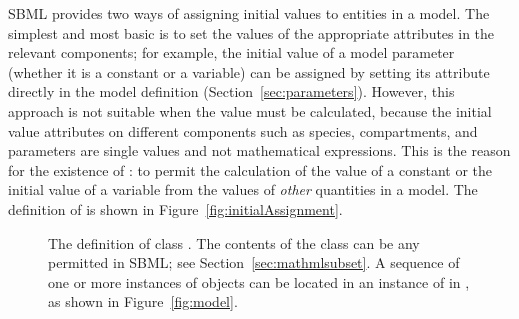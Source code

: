 SBML \thisLV provides two ways of assigning initial values to
entities in a model.  The simplest and most basic is to set the
values of the appropriate attributes in the relevant
components; for example, the initial value of a model parameter
(whether it is a constant or a variable) can be assigned by
setting its  attribute directly in the model definition
(Section~\ref{sec:parameters}).  However, this approach is not
suitable when the value must be calculated, because the initial
value attributes on different components such as species,
compartments, and parameters are single values and not
mathematical expressions.  This is the reason for the existence
of \InitialAssignment: to permit the calculation of the value of a
constant or the initial value of a variable from the values of
\emph{other} quantities in a model.  The definition of
\InitialAssignment is shown in Figure~\vref{fig:initialAssignment}.

\begin{figure}[htb]
  \vspace*{-1.5ex}
  \centering
  \small
  \vspace*{-1.5ex}
  \caption{The definition of class \InitialAssignment.  The
    contents of the  class can be any \mathml
    permitted in SBML; see
    Section~\protect\ref{sec:mathmlsubset}.  A
    sequence of one or more instances of \InitialAssignment
    objects can be located in an instance of
    \ListOfInitialAssignments in \Model, as shown in
    Figure~\protect\ref{fig:model}.}
  \label{fig:initialAssignment}
\end{figure}

